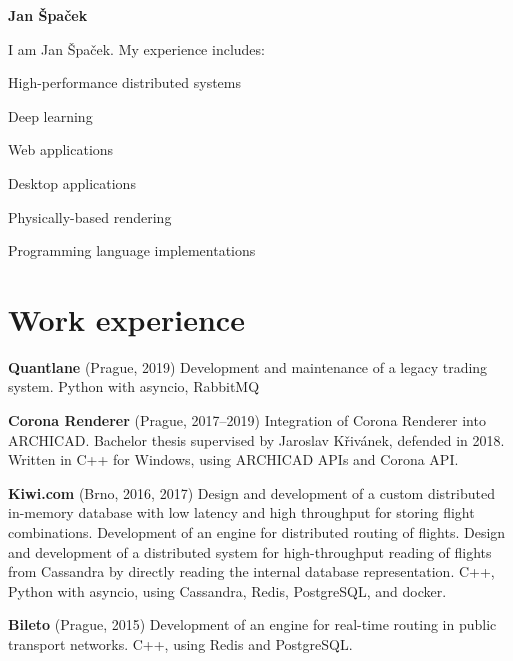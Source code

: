 \documentclass[11pt,a4paper]{article}
\begin{document}
\thispagestyle{empty}
\sffamily

{\bfseries\huge Jan Špaček}

\begin{multicols}{2}

I am Jan Špaček. My experience includes:
\begin{compactitem}
  \item High-performance distributed systems
  \item Deep learning
  \item Web applications
  \item Desktop applications
  \item Physically-based rendering
  \item Programming language implementations
\end{compactitem}

\section*{Work experience}

\textbf{Quantlane} (Prague, 2019)
  \newline Development and maintenance of a legacy trading system.
  \newline Python with asyncio, RabbitMQ

\textbf{Corona Renderer} (Prague, 2017–2019)
  \newline Integration of Corona Renderer into ARCHICAD.
  \newline Bachelor thesis supervised by Jaroslav Křivánek, defended in 2018.
  \newline Written in C++ for Windows, using ARCHICAD APIs and Corona API.

\textbf{Kiwi.com} (Brno, 2016, 2017)
  \newline Design and development of a custom distributed in-memory database
  with low latency and high throughput for storing flight combinations.
  \newline Development of an engine for distributed routing of flights.
  \newline Design and development of a distributed system for high-throughput
  reading of flights from Cassandra by directly reading the internal database
  representation.
  \newline C++, Python with asyncio, using Cassandra, Redis, PostgreSQL, and
  docker.

\textbf{Bileto} (Prague, 2015)
  \newline Development of an engine for real-time routing in public transport
    networks.
  \newline C++, using Redis and PostgreSQL.


\end{multicols}
\end{document}
